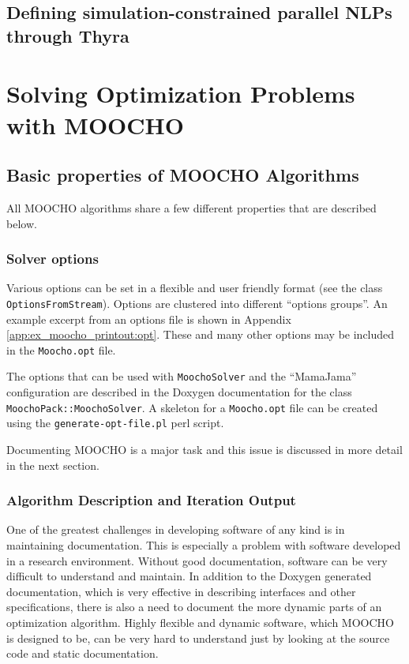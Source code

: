 \documentclass[pdf,ps2pdf,11pt]{SANDreport}
\begin{document}
%
\subsection{Defining simulation-constrained parallel NLPs through Thyra}
%

%
\section{Solving Optimization Problems with MOOCHO}
%

%
\subsection{Basic properties of MOOCHO Algorithms}
%

All MOOCHO algorithms share a few different properties that are described
below.

%
\subsubsection{Solver options}
\label{moocho:sec:solver_options}
%

Various options can be set in a flexible and user friendly format (see the
class {}\texttt{Options\-From\-Stream}).  Options are clustered into different
``options groups''.  An example excerpt from an options file is shown in
Appendix {}\ref{app:ex_moocho_printout:opt}.  These and many other options may
be included in the {}\texttt{Moocho.opt} file.

The options that can be used with {}\texttt{MoochoSolver} and the ``MamaJama''
configuration are described in the Doxygen documentation for the class
{}\texttt{MoochoPack\-::MoochoSolver}.  A skeleton for a {}\texttt{Moocho.opt}
file can be created using the {}\texttt{generate-opt-file.pl} perl script.

Documenting MOOCHO is a major task and this issue is discussed in more detail
in the next section.

%
\subsubsection{Algorithm Description and Iteration Output}
\label{moocho:sec:algo_descr_iter_out}
%

One of the greatest challenges in developing software of any kind is in
maintaining documentation.  This is especially a problem with software
developed in a research environment.  Without good documentation, software can
be very difficult to understand and maintain.  In addition to the Doxygen
generated documentation, which is very effective in describing interfaces and
other specifications, there is also a need to document the more dynamic parts
of an optimization algorithm.  Highly flexible and dynamic software, which
MOOCHO is designed to be, can be very hard to understand just by looking at
the source code and static documentation.
\end{document}
